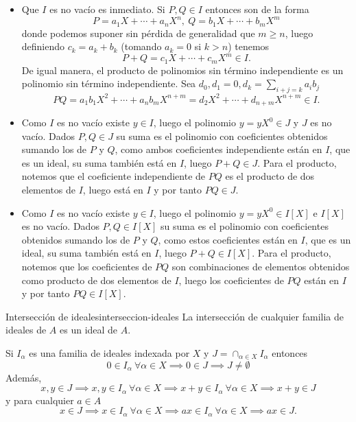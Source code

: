 \begin{proofbox}
    \begin{itemize}
        \item Que \(I\) es no vacío es inmediato. Si $P,Q \in I$ entonces son de la forma
        \[
        P = a_1X + \cdots + a_nX^n,\ Q = b_1X + \cdots + b_mX^m
        \]
        donde podemos suponer sin pérdida de generalidad que $m \geq n$, luego definiendo $c_k = a_k + b_k$ (tomando $a_k = 0$ si $k > n$) tenemos
        \[
        P + Q = c_1 X + \cdots + c_mX^m \in I.
        \]
        De igual manera, el producto de polinomios sin término independiente es un polinomio sin término independiente. Sea $d_0, d_1 = 0, d_k = \sum_{i + j = k} a_{i} b_{j}$
        \[
        PQ = a_1b_1 X^2 + \cdots + a_nb_m X^{n + m} = d_2 X^2 + \cdots + d_{n + m} X^{n + m} \in I.
        \]

        \item Como $I$ es no vacío existe $y \in I$, luego el polinomio $y = yX^0 \in J$ y $J$ es no vacío. Dados $P,Q \in J$ su suma es el polinomio con coeficientes obtenidos sumando los de $P$ y $Q$, como ambos coeficientes independiente están en $I$, que es un ideal, su suma también está en $I$, luego $P + Q \in J$. Para el producto, notemos que el coeficiente independiente de $PQ$ es el producto de dos elementos de $I$, luego está en $I$ y por tanto $PQ \in J$. 

        \item Como $I$ es no vacío existe $y \in I$, luego el polinomio $y = yX^0 \in I[X]$ e $I[X]$ es no vacío. Dados $P,Q \in I[X]$ su suma es el polinomio con coeficientes obtenidos sumando los de $P$ y $Q$, como estos coeficientes están en $I$, que es un ideal, su suma también está en $I$, luego $P + Q \in I[X]$. Para el producto, notemos que los coeficientes de $PQ$ son combinaciones de elementos obtenidos como producto de dos elementos de $I$, luego los coeficientes de $PQ$ están en $I$ y por tanto $PQ \in I[X]$.
    \end{itemize}
\end{proofbox}

\begin{proposition}{Intersección de ideales}{interseccion-ideales}
    La intersección de cualquier familia de ideales de \(A\) es un ideal de \(A\).
\end{proposition}

\begin{proofbox}
    Si $I_\alpha$ es una familia de ideales indexada por $X$ y $J = \cap_{\alpha \in X} I_\alpha$ entonces
    \[
    0 \in I_\alpha \ \forall \alpha \in X \implies 0 \in J \implies J \neq \emptyset
    \]
    Además, 
    \[
    x,y \in J \implies x,y \in I_\alpha \ \forall \alpha \in X \implies x+y \in I_\alpha \ \forall \alpha \in X \implies x+y \in J
    \]
    y para cualquier $a \in A$
    \[
    x \in J \implies x \in I_\alpha \ \forall \alpha \in X \implies ax \in I_\alpha \ \forall \alpha \in X \implies ax \in J.
    \]
\end{proofbox}


